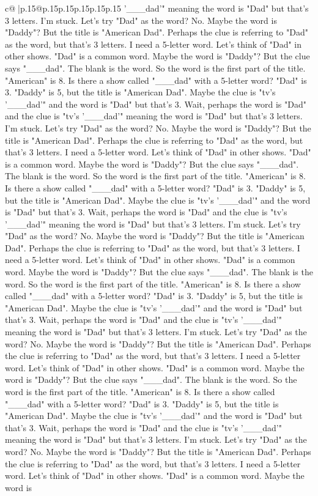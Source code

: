 \documentclass{article}
\begin{document}
{\begin{supertabular}{c@{$\;$}|p{.15\linewidth}@{}p{.15\linewidth}p{.15\linewidth}p{.15\linewidth}p{.15\linewidth}p{.15\linewidth}}
{{{'\_\_\_dad'" meaning the word is "Dad" but that's 3 letters. I'm stuck. Let's try "Dad" as the word? No. Maybe the word is "Daddy"? But the title is "American Dad". Perhaps the clue is referring to "Dad" as the word, but that's 3 letters. I need a 5{-}letter word. Let's think of "Dad" in other shows. "Dad" is a common word. Maybe the word is "Daddy"? But the clue says "\_\_\_dad". The blank is the word. So the word is the first part of the title. "American" is 8. Is there a show called "\_\_\_dad" with a 5{-}letter word? "Dad" is 3. "Daddy" is 5, but the title is "American Dad". Maybe the clue is "tv's '\_\_\_dad'" and the word is "Dad" but that's 3. Wait, perhaps the word is "Dad" and the clue is "tv's '\_\_\_dad'" meaning the word is "Dad" but that's 3 letters. I'm stuck. Let's try "Dad" as the word? No. Maybe the word is "Daddy"? But the title is "American Dad". Perhaps the clue is referring to "Dad" as the word, but that's 3 letters. I need a 5{-}letter word. Let's think of "Dad" in other shows. "Dad" is a common word. Maybe the word is "Daddy"? But the clue says "\_\_\_dad". The blank is the word. So the word is the first part of the title. "American" is 8. Is there a show called "\_\_\_dad" with a 5{-}letter word? "Dad" is 3. "Daddy" is 5, but the title is "American Dad". Maybe the clue is "tv's '\_\_\_dad'" and the word is "Dad" but that's 3. Wait, perhaps the word is "Dad" and the clue is "tv's '\_\_\_dad'" meaning the word is "Dad" but that's 3 letters. I'm stuck. Let's try "Dad" as the word? No. Maybe the word is "Daddy"? But the title is "American Dad". Perhaps the clue is referring to "Dad" as the word, but that's 3 letters. I need a 5{-}letter word. Let's think of "Dad" in other shows. "Dad" is a common word. Maybe the word is "Daddy"? But the clue says "\_\_\_dad". The blank is the word. So the word is the first part of the title. "American" is 8. Is there a show called "\_\_\_dad" with a 5{-}letter word? "Dad" is 3. "Daddy" is 5, but the title is "American Dad". Maybe the clue is "tv's '\_\_\_dad'" and the word is "Dad" but that's 3. Wait, perhaps the word is "Dad" and the clue is "tv's '\_\_\_dad'" meaning the word is "Dad" but that's 3 letters. I'm stuck. Let's try "Dad" as the word? No. Maybe the word is "Daddy"? But the title is "American Dad". Perhaps the clue is referring to "Dad" as the word, but that's 3 letters. I need a 5{-}letter word. Let's think of "Dad" in other shows. "Dad" is a common word. Maybe the word is "Daddy"? But the clue says "\_\_\_dad". The blank is the word. So the word is the first part of the title. "American" is 8. Is there a show called "\_\_\_dad" with a 5{-}letter word? "Dad" is 3. "Daddy" is 5, but the title is "American Dad". Maybe the clue is "tv's '\_\_\_dad'" and the word is "Dad" but that's 3. Wait, perhaps the word is "Dad" and the clue is "tv's '\_\_\_dad'" meaning the word is "Dad" but that's 3 letters. I'm stuck. Let's try "Dad" as the word? No. Maybe the word is "Daddy"? But the title is "American Dad". Perhaps the clue is referring to "Dad" as the word, but that's 3 letters. I need a 5{-}letter word. Let's think of "Dad" in other shows. "Dad" is a common word. Maybe the word is }}}
\end{supertabular}}
\end{document}
